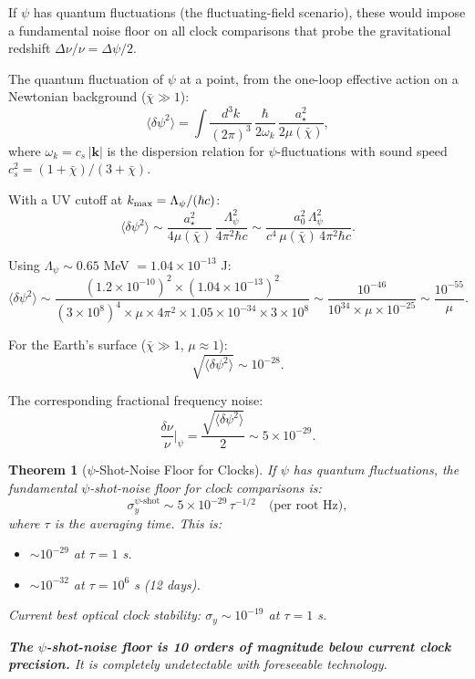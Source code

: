 \documentclass[11pt,a4paper]{article}
\newtheorem{theorem}{Theorem}
\begin{document}
If $\psi$ has quantum fluctuations (the fluctuating-field scenario), these would impose a fundamental noise floor on all clock comparisons that probe the gravitational redshift $\Delta\nu/\nu = \Delta\psi/2$.

The quantum fluctuation of $\psi$ at a point, from the one-loop effective action on a Newtonian background ($\bar\chi \gg 1$):
\begin{equation}
\langle\delta\psi^2\rangle = \int \frac{d^3k}{(2\pi)^3}\,\frac{\hbar}{2\omega_k}\,\frac{a_\star^2}{2\mu(\bar\chi)},
\end{equation}
where $\omega_k = c_s\,|\mathbf{k}|$ is the dispersion relation for $\psi$-fluctuations with sound speed $c_s^2 = (1+\bar\chi)/(3+\bar\chi)$.

With a UV cutoff at $k_{\rm max} = \Lambda_\psi/(\hbar c)$:
\begin{equation}
\langle\delta\psi^2\rangle \sim \frac{a_\star^2}{4\mu(\bar\chi)}\,\frac{\Lambda_\psi^2}{4\pi^2\hbar c}
\sim \frac{a_0^2\,\Lambda_\psi^2}{c^4\,\mu(\bar\chi)\,4\pi^2\hbar c}.
\end{equation}

Using $\Lambda_\psi \sim 0.65$ MeV $= 1.04\times 10^{-13}$ J:
\begin{equation}
\langle\delta\psi^2\rangle \sim \frac{(1.2\times 10^{-10})^2 \times (1.04\times 10^{-13})^2}{(3\times 10^8)^4 \times \mu \times 4\pi^2 \times 1.05\times 10^{-34} \times 3\times 10^8}
\sim \frac{10^{-46}}{10^{34}\times\mu\times 10^{-25}}
\sim \frac{10^{-55}}{\mu}.
\end{equation}

For the Earth's surface ($\bar\chi \gg 1$, $\mu \approx 1$):
\begin{equation}
\sqrt{\langle\delta\psi^2\rangle} \sim 10^{-28}.
\end{equation}

The corresponding fractional frequency noise:
\begin{equation}
\frac{\delta\nu}{\nu}\bigg|_\psi = \frac{\sqrt{\langle\delta\psi^2\rangle}}{2} \sim 5\times 10^{-29}.
\end{equation}

\begin{theorem}[$\psi$-Shot-Noise Floor for Clocks]
\label{thm:psi-shot-noise}
If $\psi$ has quantum fluctuations, the fundamental $\psi$-shot-noise floor for clock comparisons is:
\begin{equation}
\sigma_y^{\psi\text{-shot}} \sim 5\times 10^{-29}\,\tau^{-1/2}\quad\text{(per root Hz)},
\end{equation}
where $\tau$ is the averaging time. This is:
\begin{itemize}
\item $\sim 10^{-29}$ at $\tau = 1$ s.
\item $\sim 10^{-32}$ at $\tau = 10^6$ s (12 days).
\end{itemize}

Current best optical clock stability: $\sigma_y \sim 10^{-19}$ at $\tau = 1$ s.

\textbf{The $\psi$-shot-noise floor is 10 orders of magnitude below current clock precision.} It is completely undetectable with foreseeable technology.
\end{theorem}
\end{document}
